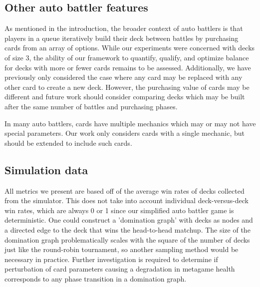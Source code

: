 
\subsection{Other auto battler features}


As mentioned in the introduction, the broader context of auto battlers is that
players in a queue iteratively build their deck between battles by purchasing
cards from an array of options. While our experiments were concerned with decks of size 3, 
the ability of our framework to quantify, qualify, and optimize balance for decks with 
more or fewer cards remains to be assessed. Additionally, we have previously only considered
the case where any card may be replaced with any other card to create a new deck. However, 
the purchasing value of cards may be different and future work should consider comparing decks
which may be built after the same number of battles and purchasing phases.


In many auto battlers, cards have multiple mechanics which may or may not have special parameters.
Our work only considers cards with a single mechanic, but should be extended to include such cards.


\subsection{Simulation data}

All metrics we present are based off of the average win rates of decks collected from the simulator. 
This does not take into account individual deck-versus-deck win rates, which are always 0 or 1 since
our simplified auto battler game is deterministic. One could construct a 'domination graph' with decks
as nodes and a directed edge to the deck that wins the head-to-head matchup. The size of the domination
graph problematically scales with the square of the number of decks just like the round-robin tournament,
so another sampling method would be necessary in practice. Further investigation is required to determine if perturbation of card parameters causing a degradation
in metagame health corresponds to any phase transition in a domination graph.

